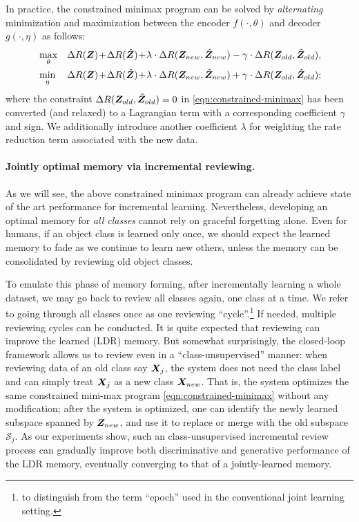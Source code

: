\documentclass[../../book-main.tex]{subfiles}
\begin{document}
In practice, the constrained minimax program can be solved by {\em alternating}  minimization and maximization between the encoder $f(\cdot, \theta)$ and decoder $g(\cdot, \eta)$ as follows:
\begin{eqnarray}
&\max_\theta  &\Delta{R(\Z)}\!+\!\Delta{R(\hat{\Z})}\!+\!\lambda\cdot  \Delta{R(\Z_{new},\hat{\Z}_{new})} - \gamma\cdot \Delta{R(\Z_{old},\hat{\Z}_{old})}, \label{eqn:relaxed-max}\\ 
&\min_\eta &\Delta{R(\Z)}\!+\!\Delta{R(\hat{\Z})}\!+\!\lambda\cdot \Delta{R(\Z_{new},\hat{\Z}_{new})} + \gamma\cdot \Delta{R(\Z_{old},\hat{\Z}_{old})}; \label{eqn:relaxed-min}
\end{eqnarray}
where the constraint $\Delta R(\bm{Z}_{old},\hat{\bm{Z}}_{old}) = 0$ in \eqref{eqn:constrained-minimax} has been converted (and relaxed) to a Lagrangian term with a corresponding coefficient $\gamma$ and sign. We additionally introduce another coefficient $\lambda$ for weighting the rate reduction term associated with the new data. %



\paragraph{Jointly optimal memory via incremental reviewing.} 
As we will see, the above constrained minimax program can already achieve state of the art performance for incremental learning. Nevertheless, developing an optimal memory for {\em all classes} cannot rely on graceful forgetting alone. Even for humans, if an object class is learned only once, we should expect the learned memory to fade as we continue to learn new others, unless the memory can be consolidated by reviewing old object classes. %

To emulate this phase of memory forming, after incrementally learning a whole dataset, we may go back to review all classes again, one class at a time. We refer to going through all classes once as one reviewing ``cycle''.\footnote{to distinguish from the term ``epoch'' used in the conventional joint learning setting.} If needed, multiple reviewing cycles can be conducted. It is quite expected that reviewing can improve the learned (LDR) memory. But somewhat surprisingly, the closed-loop framework allows us to review even in a ``{class-unsupervised}'' manner: when reviewing data of an old class say $\bm{X}_j$, the system does not need the class label and can simply treat $\bm{X}_j$ as a new class $\bm{X}_{new}$. That is, the system optimizes the same constrained mini-max program \eqref{eqn:constrained-minimax} without any modification; after the system is optimized, one can identify the newly learned subspace spanned by $\bm{Z}_{new}$, and use it to replace or merge with the old subspace $\mathcal{S}_j$. As our experiments show, such an class-unsupervised incremental review process can gradually improve both discriminative and generative performance of the LDR memory, eventually converging to that of a jointly-learned memory.
\end{document}

